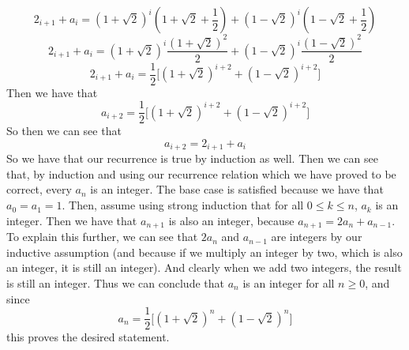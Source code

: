 \documentclass{article}
\begin{document}
\[ 2_{i+1} + a_i = (1 + \sqrt2)^i (1 + \sqrt2 + \frac{1}{2})
    + (1 - \sqrt2)^i (1 - \sqrt2 + \frac{1}{2}) \]
\[ 2_{i+1} + a_i = (1 + \sqrt2)^i \frac{(1 + \sqrt2)^2}{2}
    + (1 - \sqrt2)^i \frac{(1 - \sqrt2)^2}{2} \]
\[ 2_{i+1} + a_i = \frac{1}{2} \Big[ (1 + \sqrt2)^{i+2} + (1 - \sqrt2)^{i+2} \Big] \]
Then we have that
\[ a_{i+2} = \frac{1}{2} \Big[ (1 + \sqrt2)^{i+2} + (1 - \sqrt2)^{i+2} \Big] \]
So then we can see that
\[ a_{i+2} = 2_{i+1} + a_i \]
So we have that our recurrence is true by induction as well.
Then we can see that, by induction and
using our recurrence relation which we have proved to be correct,
every $a_n$ is an integer. The base case is satisfied because we have that
$a_0 = a_1 = 1$. Then, assume using strong induction that for all $0 \leq k \leq n$,
$a_k$ is an integer. Then we have that $a_{n+1}$ is also an integer, because
$a_{n+1} = 2a_{n} + a_{n-1}$. To explain this further, we can see that
$2a_{n}$ and $a_{n-1}$ are integers by our inductive assumption (and because
if we multiply an integer by two, which is also an integer, it is
still an integer). And clearly when we add two integers, the result is
still an integer. Thus we can conclude that $a_n$ is an integer for all $n \geq 0$,
and since
\[ a_n = \frac{1}{2} \Big[ (1 + \sqrt2)^n + (1 - \sqrt2)^n \Big] \]
this proves the desired statement.

\end{document}
